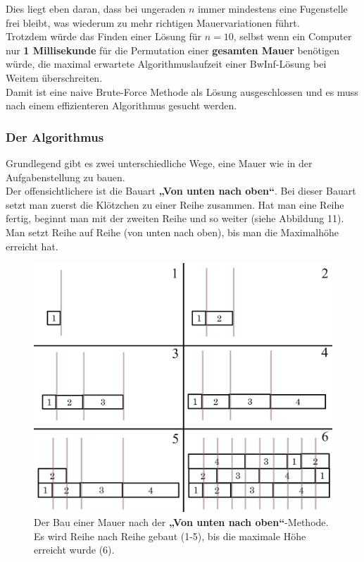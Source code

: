 \documentclass[a4paper,12pt]{article}
\begin{document}
Dies liegt eben daran, dass bei ungeraden $n$ immer mindestens eine Fugenstelle frei bleibt, was wiederum zu mehr richtigen Mauervariationen führt.
\\[0.4cm]
Trotzdem würde das Finden einer Lösung für $n = 10$, selbst wenn ein Computer nur \textbf{1 Millisekunde} für die Permutation einer \textbf{gesamten Mauer} benötigen würde, die maximal erwartete Algorithmuslaufzeit einer BwInf-Lösung bei Weitem überschreiten.
\\[0.4cm]
Damit ist eine naive Brute-Force Methode als Lösung ausgeschlossen und es muss nach einem effizienteren Algorithmus gesucht werden.

\subsubsection{Der Algorithmus}
Grundlegend gibt es zwei unterschiedliche Wege, eine Mauer wie in der Aufgabenstellung zu bauen.
\\[0.4cm]
Der offensichtlichere ist die Bauart \textbf{„Von unten nach oben“}. Bei dieser Bauart setzt man zuerst die Klötzchen zu einer Reihe zusammen. Hat man eine Reihe fertig, beginnt man mit der zweiten Reihe und so weiter (siehe Abbildung 11). Man setzt Reihe auf Reihe (von unten nach oben), bis man die Maximalhöhe erreicht hat.
\begin{figure}[H]
    \centering
    \includegraphics[width=1\linewidth]{Bilder/Aufgabe1/Definition_Mauerbauart_01.png}
    \caption{Der Bau einer Mauer nach der \textbf{„Von unten nach oben“}-Methode. Es wird Reihe nach Reihe gebaut (1-5), bis die maximale Höhe erreicht wurde (6).}
\end{figure}
\end{document}
